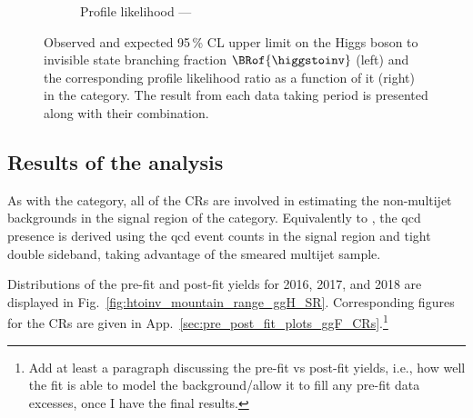 \begin{figure}[htbp]
\begin{subfigure}[t]{0.45\textwidth}
        \caption{Profile likelihood --- \VH}
    \end{subfigure}
    \caption[Observed and expected 95\,\% CL upper limit on the Higgs boson to invisible state branching fraction $\BRof{\higgstoinv}$ (left) and the corresponding profile likelihood ratio as a function of it (right) in the \VH category]{Observed and expected 95\,\% CL upper limit on the Higgs boson to invisible state branching fraction $\BRof{\higgstoinv}$ (left) and the corresponding profile likelihood ratio as a function of it (right) in the \VH category. The result from each data taking period is presented along with their combination.}
    \label{fig:htoinv_limit_VH}
\end{figure}

\clearpage




\subsection{Results of the \texorpdfstring{\ggH}{ggH} analysis}
\label{subsec:htoinv_analysis_ggF}

As with the \VH category, all of the \glspl{CR} are involved in estimating the non-multijet backgrounds in the signal region of the \ggH category. Equivalently to \ttH, the \acrshort{qcd} presence is derived using the \acrshort{qcd} event counts in the signal region and tight double sideband, taking advantage of the smeared multijet sample.

Distributions of the pre-fit and post-fit yields for 2016, 2017, and 2018 are displayed in Fig.~\ref{fig:htoinv_mountain_range_ggH_SR}. Corresponding figures for the \glspl{CR} are given in App.~\ref{sec:pre_post_fit_plots_ggF_CRs}.\footnote{Add at least a paragraph discussing the pre-fit vs post-fit yields, i.e., how well the fit is able to model the background/allow it to fill any pre-fit data excesses, once I have the final results.}

